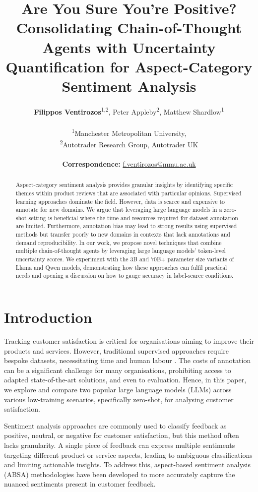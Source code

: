 \documentclass[11pt]{article}
\title{Are You Sure You’re Positive? Consolidating Chain-of-Thought Agents with Uncertainty Quantification for Aspect-Category Sentiment Analysis}
\author{
  \textbf{Filippos Ventirozos}\textsuperscript{1,2},
  Peter Appleby\textsuperscript{2},
  Matthew Shardlow\textsuperscript{1}
  \\
  \\
  \textsuperscript{1}Manchester Metropolitan University, \\
  \textsuperscript{2}Autotrader Research Group, Autotrader UK \\
  \\
  \small{
    \textbf{Correspondence:} \href{mailto:f.ventirozos@mmu.ac.uk}{f.ventirozos@mmu.ac.uk}
  }
}
\begin{document}
\maketitle
\begin{abstract}

Aspect-category sentiment analysis provides granular insights by identifying specific themes within product reviews that are associated with particular opinions. Supervised learning approaches dominate the field. However, data is scarce and expensive to annotate for new domains. We argue that leveraging large language models in a zero-shot setting is beneficial where the time and resources required for dataset annotation are limited. Furthermore, annotation bias may lead to strong results using supervised methods but transfer poorly to new domains in contexts that lack annotations and demand reproducibility. In our work, we propose novel techniques that combine multiple chain-of-thought agents by leveraging large language models’ token-level uncertainty scores. We experiment with the 3B and 70B+ parameter size variants of Llama and Qwen models, demonstrating how these approaches can fulfil practical needs and opening a discussion on how to gauge accuracy in label-scarce conditions. 


\end{abstract}


\section{Introduction}
Tracking customer satisfaction is critical for organisations aiming to improve their products and services. However, traditional supervised approaches require bespoke datasets, necessitating time and human labour \citep{Pustejovsky_Stubbs_2013}. The costs of annotation can be a significant challenge for many organisations, prohibiting access to adapted state-of-the-art solutions, and even to evaluation. Hence, in this paper, we explore and compare two popular large language models (LLMs) across various low-training scenarios, specifically zero-shot, for analysing customer satisfaction. 

Sentiment analysis approaches are commonly used to classify feedback as positive, neutral, or negative for customer satisfaction, but this method often lacks granularity. A single piece of feedback can express multiple sentiments targeting different product or service aspects, leading to ambiguous classifications and limiting actionable insights. To address this, aspect-based sentiment analysis (ABSA) methodologies \citep{9996141} have been developed to more accurately capture the nuanced sentiments present in customer feedback.
\end{document}
